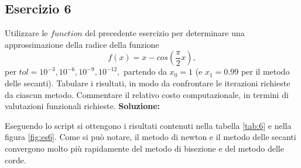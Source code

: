 \subsection{Esercizio 6}
Utilizzare le $function$ del precedente esercizio per determinare una approssimazione
della radice della funzione
\[
        f(x) = x - cos(\frac{\pi}{2}x),
\]
per $tol = 10^{-3}, 10^{-6}, 10^{-9}, 10^{-12},$ partendo da $x_0 = 1$
(e $x_1 = 0.99$ per il metodo delle secanti). Tabulare i risultati,
in modo da confrontare le iterazioni richieste da ciascun metodo. Commentare
il relativo costo computazionale, in termini di valutazioni funzionali richieste.
\newline \textbf{Soluzione:}

Eseguendo lo script  si ottengono i risultati contenuti nella tabella \ref{tab:6}
e nella figura \ref{fig:es6}. Come si può notare, il metodo di newton e il metodo delle secanti
convergono molto più rapidamente del metodo di bisezione e del metodo delle corde.
\begin{table}[ht]
        \centering
        \renewcommand\arraystretch{2}
        \caption{Valori approssimati per $x - cos$ con i metodi di Newton, secanti e Steffensen}
        \label{tab:6}
\end{table}
\FloatBarrier
